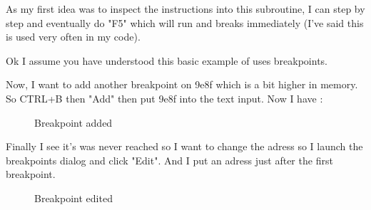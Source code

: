 \documentclass[10pt]{report}
\begin{document}
As my first idea was to inspect the instructions into this subroutine, I can step by step and eventually do "F5" which will run and breaks immediately (I've said this is used very often in my code).\newline

Ok I assume you have understood this basic example of uses breakpoints.\newline

Now, I want to add another breakpoint on 9e8f which is a bit higher in memory.\newline
So CTRL+B then "Add" then put 9e8f into the text input.\newline
Now I have :\newline

\begin{figure}[H]
\centering
{}
\caption{Breakpoint added}
\end{figure}
Finally I see it's was never reached so I want to change the adress so I launch the breakpoints dialog and click "Edit".\newline
And I put an adress just after the first breakpoint.\newline
\begin{figure}[H]
\centering
{}
\caption{Breakpoint edited}
\end{figure}
\end{document}
